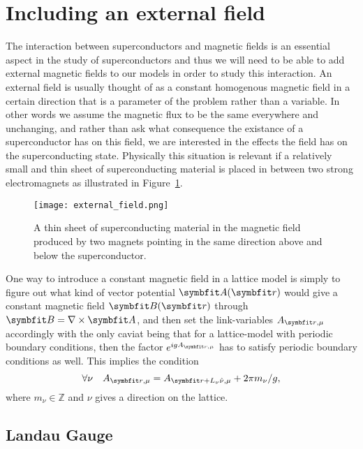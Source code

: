 \section{Including an external field}

The interaction between superconductors and magnetic fields is an essential aspect in the study of superconductors and thus we will need to be able to add external magnetic fields
to our models in order to study this interaction. An external field is usually thought of as a constant homogenous magnetic field in a certain direction that is a parameter of
the problem rather than a variable. In other words we assume the magnetic flux to be the same everywhere and unchanging, and rather than ask what consequence the existance of a superconductor
has on this field, we are interested in the effects the field has on the superconducting state. Physically this situation is relevant \eg if a relatively small and thin sheet
of superconducting material is placed in between two strong electromagnets as illustrated in Figure~\ref{fig:LM:Field:externalField}.
\begin{figure}[t]
    \centering
    \texttt{[image: external\_field.png]}
    \caption{A thin sheet of superconducting material in the magnetic field produced by two magnets pointing in the same direction above and below the superconductor.}
    \label{fig:LM:Field:externalField}
\end{figure}

One way to introduce a constant magnetic field in a lattice model is simply to figure out what kind of vector potential $\v{A}(\v{r})$ would give a constant magnetic field $\v{B}(\v{r})$
through $\v{B} = \nabla\times\v{A}$, and then set the link-variables $A_{\v{r},\mu}$ accordingly with the only caviat being that for a lattice-model with periodic boundary conditions,
then the factor $e^{igA_{\v{r},\mu}}$ has to satisfy periodic boundary conditions as well. This implies the condition
\begin{equation}
    \label{eq:LM:Field:periodicBC}
    \forall\nu\quad A_{\v{r},\mu} = A_{\v{r}+L_\nu\hat{\nu},\mu} + 2\pi m_\nu/g,
\end{equation}
where $m_\nu\in\mathbb{Z}$ and $\nu$ gives a direction on the lattice.

\subsection{Landau Gauge}
\label{sec:LM:Field:LandauGauge}

